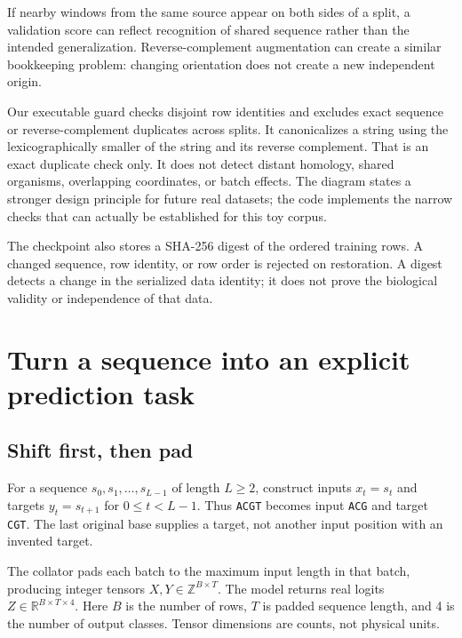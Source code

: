 If nearby windows from the same source appear on both sides of a split, a validation score can reflect recognition of shared sequence rather than the intended generalization. Reverse-complement augmentation can create a similar bookkeeping problem: changing orientation does not create a new independent origin.

Our executable guard checks disjoint row identities and excludes exact sequence or reverse-complement duplicates across splits. It canonicalizes a string using the lexicographically smaller of the string and its reverse complement. That is an exact duplicate check only. It does not detect distant homology, shared organisms, overlapping coordinates, or batch effects. The diagram states a stronger design principle for future real datasets; the code implements the narrow checks that can actually be established for this toy corpus.

The checkpoint also stores a SHA-256 digest of the ordered training rows. A changed sequence, row identity, or row order is rejected on restoration. A digest detects a change in the serialized data identity; it does not prove the biological validity or independence of that data.

\section{Turn a sequence into an explicit prediction task}

\subsection{Shift first, then pad}

For a sequence $s_0,s_1,\ldots,s_{L-1}$ of length $L\geq2$, construct inputs $x_t=s_t$ and targets $y_t=s_{t+1}$ for $0\leq t<L-1$. Thus \texttt{ACGT} becomes input \texttt{ACG} and target \texttt{CGT}. The last original base supplies a target, not another input position with an invented target.


The collator pads each batch to the maximum input length in that batch, producing integer tensors $X,Y\in\mathbb Z^{B\times T}$. The model returns real logits $Z\in\mathbb R^{B\times T\times4}$. Here $B$ is the number of rows, $T$ is padded sequence length, and 4 is the number of output classes. Tensor dimensions are counts, not physical units.

